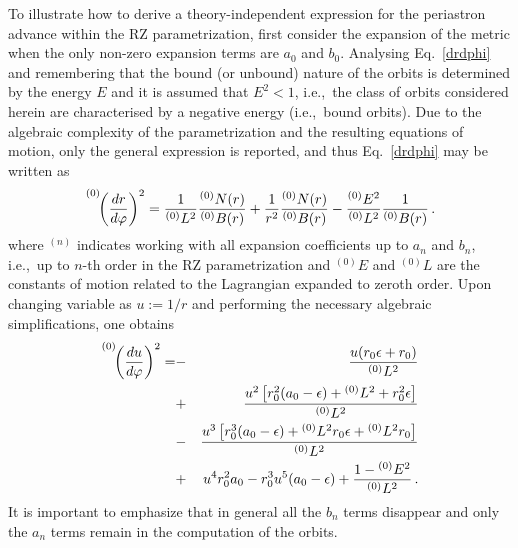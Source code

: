 \documentclass[a4paper,aps,twocolumn,showpacs,showkeys,nofootinbib,preprintnumbers,superscriptaddress,amsmath,amssymb,amsfonts]{revtex4-1}
\newcommand{\ie}{{i.e.,}~}
\begin{document}
To illustrate how to derive a theory-independent expression for the
periastron advance within the RZ parametrization, first consider the
expansion of the metric when the only non-zero expansion terms are
$a_0$ and $b_0$.
Analysing Eq.~\eqref{drdphi} and remembering that the
bound (or unbound) nature of the orbits is determined by the energy $E$
and it is assumed that $E^2<1$, \ie the class of orbits considered herein
are characterised by a negative energy (\ie bound orbits). 
Due to the algebraic complexity
of the parametrization and the resulting equations of motion, only the
general expression is reported, and thus Eq.~\eqref{drdphi} may be written as
%
\begin{equation} 
\label{drdphi0}
\hspace{-7.5mm}{\phantom{\left(\frac{1}{1}\right)}}^{(0)}\!\!
                   \left(\frac{dr}{d\varphi}\right)^2 =
                   \frac{1}{{}^{(0)}L^2}\frac{{}^{(0)}N(r)}{ {}^{(0)}B(r)} + 
                   \frac{1}{r^2}\frac{{}^{(0)}N(r)}{{}^{(0)}B(r)}-\frac{{}^{(0)}E^2}
                     {{}^{(0)}L^2}\frac{1}{ {}^{(0)}B(r)} \,.
\end{equation}  
%
where ${}^{(n)}$ indicates working with all expansion coefficients up to
$a_n$ and $b_n$, \ie up to $n$-th order in the RZ parametrization and  ${}^{(0)}E$ and ${}^{(0)}L$ are the constants of motion related to the Lagrangian expanded to zeroth order. 
Upon changing variable as $u:=1/r$ and performing the necessary 
algebraic simplifications, one obtains
%
\begin{eqnarray} 
\label{dudphi0u}
\hspace{-7.5mm}{\phantom{\left(\frac{1}{1}\right)}}^{(0)}\!\!\left(\frac{du}{d\varphi}
                                     \right)^2 = &-& \frac{u (r_0 \epsilon+r_0)}{{}^{(0)}L^2} \nonumber \\
                 &+& \frac{u^2 \left[r_0^2 (a_0-\epsilon)+{}^{(0)}L^2+r_0^2 \epsilon\right]}
                           {{}^{(0)}L^2} \nonumber \\
             &-&\frac{u^3 \left[r_0^3 (a_0-\epsilon)+{}^{(0)}L^2 r_0 \epsilon + 
                     {}^{(0)}L^2 r_0\right]}{{}^{(0)}L^2}\nonumber \\
             &+& u^4r_0^2 a_0-r_0^3 u^5 (a_0-\epsilon) + 
                     \frac{1-{}^{(0)}E^2}{{}^{(0)}L^2}\,.
\nonumber \\
\end{eqnarray}
%
It is important to emphasize that in general all the $b_n$  terms disappear and
only the $a_n$ terms remain in the computation of the orbits.
\end{document}
